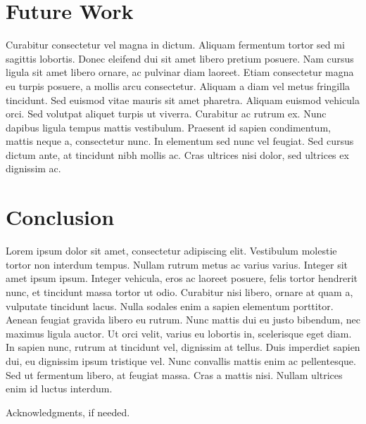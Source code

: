 \documentclass{sigplanconf}
\begin{document}
\section{Future Work}

Curabitur consectetur vel magna in dictum. Aliquam fermentum tortor sed mi sagittis lobortis. Donec eleifend dui sit amet libero pretium posuere. Nam cursus ligula sit amet libero ornare, ac pulvinar diam laoreet. Etiam consectetur magna eu turpis posuere, a mollis arcu consectetur. Aliquam a diam vel metus fringilla tincidunt. Sed euismod vitae mauris sit amet pharetra. Aliquam euismod vehicula orci. Sed volutpat aliquet turpis ut viverra. Curabitur ac rutrum ex. Nunc dapibus ligula tempus mattis vestibulum. Praesent id sapien condimentum, mattis neque a, consectetur nunc. In elementum sed nunc vel feugiat. Sed cursus dictum ante, at tincidunt nibh mollis ac. Cras ultrices nisi dolor, sed ultrices ex dignissim ac.

\section{Conclusion}

Lorem ipsum dolor sit amet, consectetur adipiscing elit. Vestibulum molestie tortor non interdum tempus. Nullam rutrum metus ac varius varius. Integer sit amet ipsum ipsum. Integer vehicula, eros ac laoreet posuere, felis tortor hendrerit nunc, et tincidunt massa tortor ut odio. Curabitur nisi libero, ornare at quam a, vulputate tincidunt lacus. Nulla sodales enim a sapien elementum porttitor. Aenean feugiat gravida libero eu rutrum. Nunc mattis dui eu justo bibendum, nec maximus ligula auctor. Ut orci velit, varius eu lobortis in, scelerisque eget diam. In sapien nunc, rutrum at tincidunt vel, dignissim at tellus. Duis imperdiet sapien dui, eu dignissim ipsum tristique vel. Nunc convallis mattis enim ac pellentesque. Sed ut fermentum libero, at feugiat massa. Cras a mattis nisi. Nullam ultrices enim id luctus interdum.

%

\acks

Acknowledgments, if needed.




%
%
\end{document}
